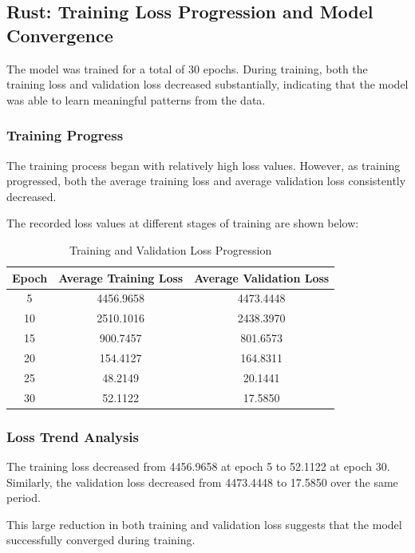 \documentclass{ieeeaccess}
\begin{document}
\subsection{Rust: Training Loss Progression and Model Convergence}

The model was trained for a total of 30 epochs. During training, both the training loss and validation loss decreased substantially, indicating that the model was able to learn meaningful patterns from the data.

\subsubsection{Training Progress}

The training process began with relatively high loss values. However, as training progressed, both the average training loss and average validation loss consistently decreased.

The recorded loss values at different stages of training are shown below:

\begin{table}[t!]
\centering
\caption{Training and Validation Loss Progression}
\begin{tabular}{|c|c|c|}
\hline
\textbf{Epoch} & \textbf{Average Training Loss} & \textbf{Average Validation Loss} \\
\hline
5  & 4456.9658 & 4473.4448 \\
10 & 2510.1016 & 2438.3970 \\
15 & 900.7457  & 801.6573 \\
20 & 154.4127  & 164.8311 \\
25 & 48.2149   & 20.1441 \\
30 & 52.1122   & 17.5850 \\
\hline
\end{tabular}
\label{tab:loss_progression}
\end{table}

\subsubsection{Loss Trend Analysis}

The training loss decreased from 4456.9658 at epoch 5 to 52.1122 at epoch 30. Similarly, the validation loss decreased from 4473.4448 to 17.5850 over the same period.

This large reduction in both training and validation loss suggests that the model successfully converged during training.
\end{document}
